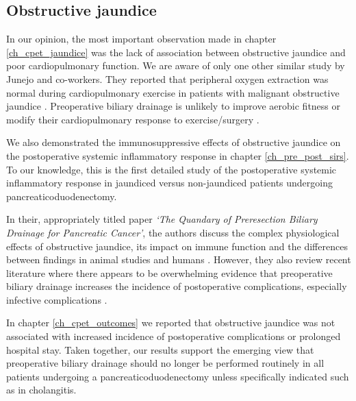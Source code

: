 \subsection{Obstructive jaundice}
In our opinion, the most important observation made in chapter \ref{ch_cpet_jaundice} was the lack of association between obstructive jaundice and poor cardiopulmonary function. 
We are aware of only one other similar study by Junejo and co-workers. They reported that peripheral oxygen extraction was normal during cardiopulmonary exercise in patients with malignant obstructive jaundice \parencite{junejo_peripheral_2014}.
Preoperative biliary drainage is unlikely to improve aerobic fitness or modify their cardiopulmonary response to exercise/surgery \parencite{parker_serum_2014}.

We also demonstrated the immunosuppressive effects of obstructive jaundice on the postoperative systemic inflammatory response in chapter \ref{ch_pre_post_sirs}. 
To our knowledge, this is the first detailed study of the postoperative systemic inflammatory response in jaundiced versus non-jaundiced patients undergoing pancreaticoduodenectomy.

In their, appropriately titled paper \textit{`The Quandary of Preresection Biliary Drainage for Pancreatic Cancer'}, the authors discuss the complex physiological effects of obstructive jaundice, its impact on immune function and the differences between findings in animal studies and humans \parencite{tol_quandary_2012}.
However, they also review recent literature where there appears to be overwhelming evidence that preoperative biliary drainage increases the incidence of postoperative complications, especially infective complications \parencite{van_der_gaag_preoperative_2010, arkadopoulos_preoperative_2014, fujii_preoperative_2015, furukawa_negative_2015}.

In chapter \ref{ch_cpet_outcomes} we reported that obstructive jaundice was not associated with increased incidence of postoperative complications or prolonged hospital stay. 
Taken together, our results support the emerging view that preoperative biliary drainage should no longer be performed routinely in all patients undergoing a pancreaticoduodenectomy unless specifically indicated such as in cholangitis.

